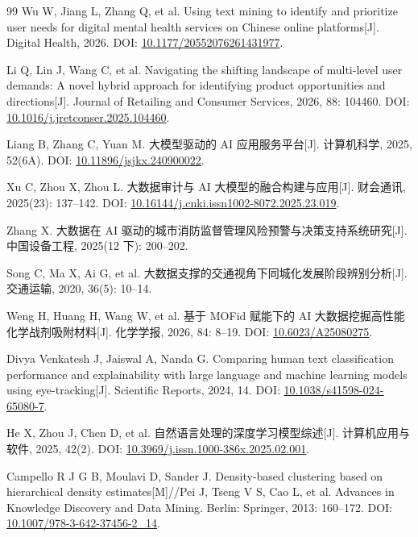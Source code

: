 \begin{thebibliography}{99}
Wu W, Jiang L, Zhang Q, et al. Using text mining to identify and prioritize user needs for digital mental health services on Chinese online platforms[J]. Digital Health, 2026. DOI: \href{https://doi.org/10.1177/20552076261431977}{10.1177/20552076261431977}.

Li Q, Lin J, Wang C, et al. Navigating the shifting landscape of multi-level user demands: A novel hybrid approach for identifying product opportunities and directions[J]. Journal of Retailing and Consumer Services, 2026, 88: 104460. DOI: \href{https://doi.org/10.1016/j.jretconser.2025.104460}{10.1016/j.jretconser.2025.104460}.

Liang B, Zhang C, Yuan M. 大模型驱动的 AI 应用服务平台[J]. 计算机科学, 2025, 52(6A). DOI: \href{https://doi.org/10.11896/jsjkx.240900022}{10.11896/jsjkx.240900022}.

Xu C, Zhou X, Zhou L. 大数据审计与 AI 大模型的融合构建与应用[J]. 财会通讯, 2025(23): 137--142. DOI: \href{https://doi.org/10.16144/j.cnki.issn1002-8072.2025.23.019}{10.16144/j.cnki.issn1002-8072.2025.23.019}.

Zhang X. 大数据在 AI 驱动的城市消防监督管理风险预警与决策支持系统研究[J]. 中国设备工程, 2025(12 下): 200--202.

Song C, Ma X, Ai G, et al. 大数据支撑的交通视角下同城化发展阶段辨别分析[J]. 交通运输, 2020, 36(5): 10--14.

Weng H, Huang H, Wang W, et al. 基于 MOFid 赋能下的 AI 大数据挖掘高性能化学战剂吸附材料[J]. 化学学报, 2026, 84: 8--19. DOI: \href{https://doi.org/10.6023/A25080275}{10.6023/A25080275}.

Divya Venkatesh J, Jaiswal A, Nanda G. Comparing human text classification performance and explainability with large language and machine learning models using eye-tracking[J]. Scientific Reports, 2024, 14. DOI: \href{https://doi.org/10.1038/s41598-024-65080-7}{10.1038/s41598-024-65080-7}.

He X, Zhou J, Chen D, et al. 自然语言处理的深度学习模型综述[J]. 计算机应用与软件, 2025, 42(2). DOI: \href{https://doi.org/10.3969/j.issn.1000-386x.2025.02.001}{10.3969/j.issn.1000-386x.2025.02.001}.

Campello R J G B, Moulavi D, Sander J. Density-based clustering based on hierarchical density estimates[M]//Pei J, Tseng V S, Cao L, et al. Advances in Knowledge Discovery and Data Mining. Berlin: Springer, 2013: 160--172. DOI: \href{https://doi.org/10.1007/978-3-642-37456-2_14}{10.1007/978-3-642-37456-2\_14}.


\end{thebibliography}
